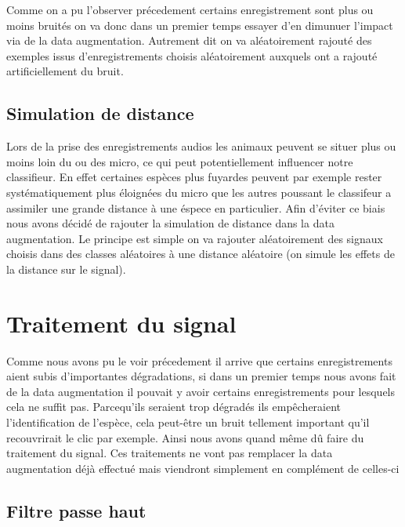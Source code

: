 Comme on a pu l'observer précedement certains enregistrement sont plus ou moins bruités on va donc dans un premier temps essayer d'en dimunuer l'impact via de la data augmentation. Autrement dit on va aléatoirement rajouté des exemples issus d'enregistrements choisis aléatoirement auxquels ont a rajouté artificiellement du bruit.

\hypertarget{Simulation-de-distance}{%
\subsection{Simulation de distance}
\label{Simulation-de-distance}}

Lors de la prise des enregistrements audios les animaux peuvent se situer plus ou moins loin du ou des micro, ce qui peut potentiellement influencer notre classifieur. En effet certaines espèces plus fuyardes peuvent par exemple rester systématiquement plus éloignées du micro que les autres poussant le classifeur a assimiler une grande distance à une éspece en particulier.
Afin d'éviter ce biais nous avons décidé de rajouter la simulation de distance dans la data augmentation.
Le principe est simple on va rajouter aléatoirement des signaux choisis dans des classes aléatoires à une distance aléatoire (on simule les effets de la distance sur le signal).

\hypertarget{Traitement-du-signal}{%
\section{Traitement du signal}
\label{Traitement-du-signal}}

Comme nous avons pu le voir précedement il arrive que certains enregistrements aient subis d'importantes dégradations, si dans un premier temps nous avons fait de la data augmentation il pouvait y avoir certains enregistrements pour lesquels cela ne suffit pas. Parcequ'ils seraient trop dégradés ils empêcheraient l'identification de l'espèce, cela peut-être un bruit tellement important qu'il recouvrirait le clic par exemple. Ainsi nous avons quand même dû faire du traitement du signal. Ces traitements ne vont pas remplacer la data augmentation déjà effectué mais viendront simplement en complément de celles-ci

\hypertarget{Filtre-passe-haut}{%
\subsection{Filtre passe haut}
\label{Filtre-passe-haut}}

